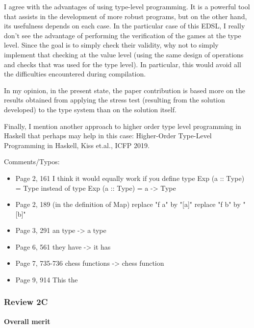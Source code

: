 I agree with the advantages of using type-level programming. It is a powerful tool that assists in the development of more robust programs, but on the other hand, its usefulness depends on each case. In the particular case of this EDSL, I really don't see the advantage of performing the verification of the games at the type level. Since the goal is to simply check their validity, why not to simply implement that checking at the value level (using the same design of operations and checks that was used for the type level). In particular, this would avoid all the difficulties encountered during compilation.

In my opinion, in the present state, the paper contribution is based more on the results obtained from applying the stress test (resulting from the solution developed) to the type system than on the solution itself.

Finally, I mention another approach to higher order type level programming in Haskell that perhaps may help in this case: Higher-Order Type-Level Programming in Haskell, Kiss et.al., ICFP 2019.

Comments/Typos:

\begin{itemize}
    \item Page 2, 161
          I think it would equally work if you define
          type Exp (a :: Type) = Type
          instead of
          type Exp (a :: Type) = a -> Type

    \item Page 2, 189 (in the definition of Map)
          replace "f a" by "[a]"
          replace "f b" by "[b]"

    \item Page 3, 291
          an type -> a type

    \item Page 6, 561
          they have -> it has

    \item Page 7, 735-736
          chess functions -> chess function

    \item Page 9, 914
          This the
\end{itemize}

\subsubsection{Review 2C}

\paragraph{Overall merit}

